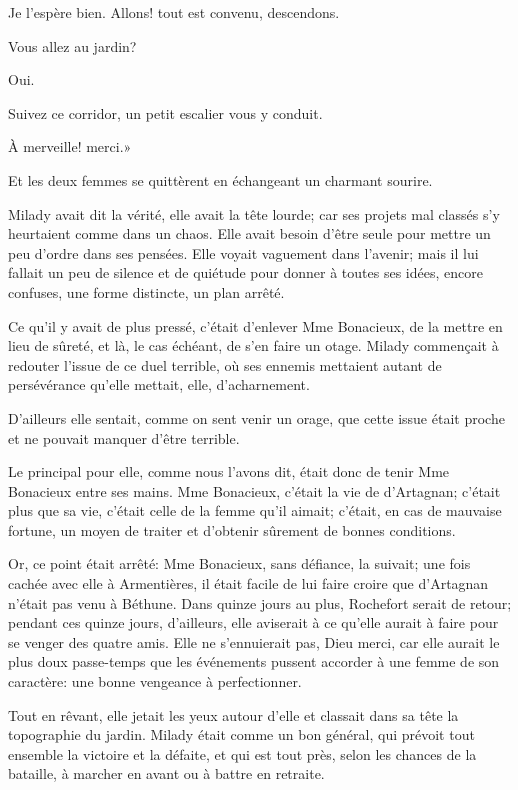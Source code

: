 \speak  Je l'espère bien. Allons! tout est convenu, descendons. 

\speak  Vous allez au jardin? 

\speak  Oui. 

\speak  Suivez ce corridor, un petit escalier vous y conduit. 

\speak  À merveille! merci.» 

Et les deux femmes se quittèrent en échangeant un charmant sourire. 

Milady avait dit la vérité, elle avait la tête lourde; car ses projets mal classés s'y heurtaient comme dans un chaos. Elle avait besoin d'être seule pour mettre un peu d'ordre dans ses pensées. Elle voyait vaguement dans l'avenir; mais il lui fallait un peu de silence et de quiétude pour donner à toutes ses idées, encore confuses, une forme distincte, un plan arrêté. 

Ce qu'il y avait de plus pressé, c'était d'enlever Mme Bonacieux, de la mettre en lieu de sûreté, et là, le cas échéant, de s'en faire un otage. Milady commençait à redouter l'issue de ce duel terrible, où ses ennemis mettaient autant de persévérance qu'elle mettait, elle, d'acharnement. 

D'ailleurs elle sentait, comme on sent venir un orage, que cette issue était proche et ne pouvait manquer d'être terrible. 

Le principal pour elle, comme nous l'avons dit, était donc de tenir Mme Bonacieux entre ses mains. Mme Bonacieux, c'était la vie de d'Artagnan; c'était plus que sa vie, c'était celle de la femme qu'il aimait; c'était, en cas de mauvaise fortune, un moyen de traiter et d'obtenir sûrement de bonnes conditions. 

Or, ce point était arrêté: Mme Bonacieux, sans défiance, la suivait; une fois cachée avec elle à Armentières, il était facile de lui faire croire que d'Artagnan n'était pas venu à Béthune. Dans quinze jours au plus, Rochefort serait de retour; pendant ces quinze jours, d'ailleurs, elle aviserait à ce qu'elle aurait à faire pour se venger des quatre amis. Elle ne s'ennuierait pas, Dieu merci, car elle aurait le plus doux passe-temps que les événements pussent accorder à une femme de son caractère: une bonne vengeance à perfectionner. 

Tout en rêvant, elle jetait les yeux autour d'elle et classait dans sa tête la topographie du jardin. Milady était comme un bon général, qui prévoit tout ensemble la victoire et la défaite, et qui est tout près, selon les chances de la bataille, à marcher en avant ou à battre en retraite. 

